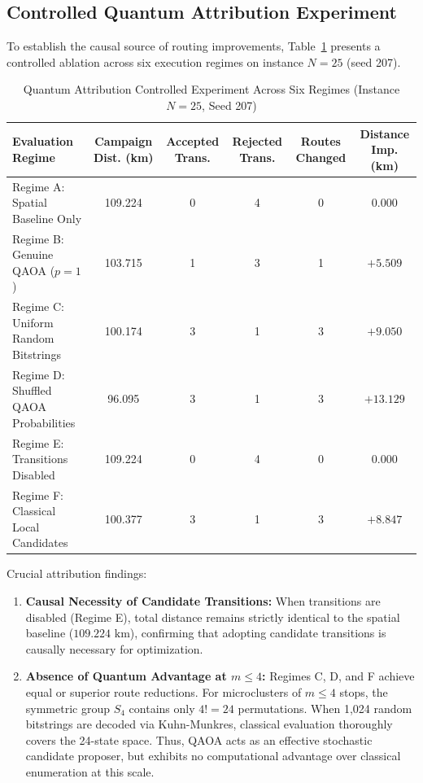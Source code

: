 \documentclass[journal,10pt]{IEEEtran}
\begin{document}
\subsection{Controlled Quantum Attribution Experiment}
To establish the causal source of routing improvements, Table~\ref{tab:attribution} presents a controlled ablation across six execution regimes on instance $N=25$ (seed 207).

\begin{table}[t]
\caption{Quantum Attribution Controlled Experiment Across Six Regimes (Instance $N=25$, Seed 207)}
\label{tab:attribution}
\centering
\begin{tabular}{lccccc}
\toprule
\textbf{Evaluation Regime} & \textbf{Campaign Dist. (km)} & \textbf{Accepted Trans.} & \textbf{Rejected Trans.} & \textbf{Routes Changed} & \textbf{Distance Imp. (km)} \\
\midrule
Regime A: Spatial Baseline Only       & 109.224 & 0 & 4 & 0 & 0.000 \\
Regime B: Genuine QAOA ($p=1$)        & 103.715 & 1 & 3 & 1 & $+5.509$ \\
Regime C: Uniform Random Bitstrings   & 100.174 & 3 & 1 & 3 & $+9.050$ \\
Regime D: Shuffled QAOA Probabilities & 96.095  & 3 & 1 & 3 & $+13.129$ \\
Regime E: Transitions Disabled        & 109.224 & 0 & 4 & 0 & 0.000 \\
Regime F: Classical Local Candidates  & 100.377 & 3 & 1 & 3 & $+8.847$ \\
\bottomrule
\end{tabular}
\end{table}

Crucial attribution findings:
\begin{enumerate}
    \item \textbf{Causal Necessity of Candidate Transitions:} When transitions are disabled (Regime E), total distance remains strictly identical to the spatial baseline ($109.224\text{ km}$), confirming that adopting candidate transitions is causally necessary for optimization.
    \item \textbf{Absence of Quantum Advantage at $m \le 4$:} Regimes C, D, and F achieve equal or superior route reductions. For microclusters of $m \le 4$ stops, the symmetric group $S_4$ contains only $4! = 24$ permutations. When 1,024 random bitstrings are decoded via Kuhn-Munkres, classical evaluation thoroughly covers the 24-state space. Thus, QAOA acts as an effective stochastic candidate proposer, but exhibits no computational advantage over classical enumeration at this scale.
\end{enumerate}
\end{document}
